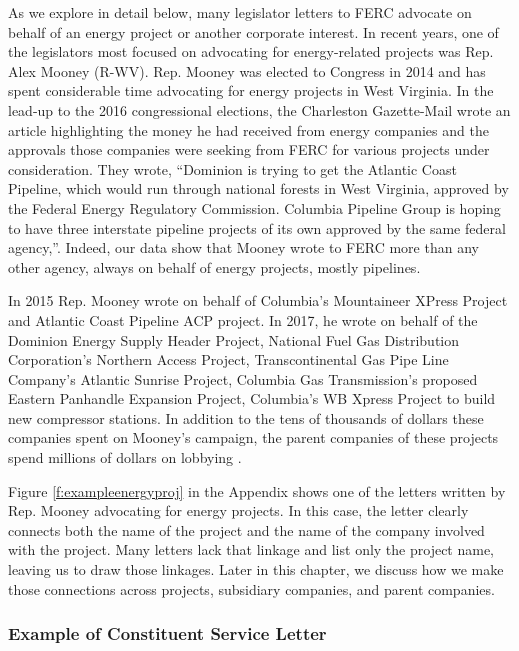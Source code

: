 As we explore in detail below, many legislator letters to FERC advocate on behalf of an energy project or another corporate interest. 
In recent years, one of the legislators most focused on advocating for energy-related projects was Rep. Alex Mooney (R-WV).  
Rep. Mooney was elected to Congress in 2014 and has spent considerable time advocating for energy projects in West Virginia. In the lead-up to the 2016 congressional elections, the Charleston Gazette-Mail wrote an article highlighting the money he had received from energy companies and the approvals those companies were seeking from FERC for various projects under consideration.  They wrote, ``Dominion is trying to get the Atlantic Coast Pipeline, which would run through national forests in West Virginia, approved by the Federal Energy Regulatory Commission. Columbia Pipeline Group is hoping to have three interstate pipeline projects of its own approved by the same federal agency,''\citep[pg. 4]{Brown2016cgm}.  Indeed, our data show that Mooney wrote to FERC more than any other agency, always on behalf of energy projects, mostly pipelines. 

In 2015 Rep. Mooney wrote on behalf of Columbia's Mountaineer XPress Project and Atlantic Coast Pipeline ACP project.  In 2017, he wrote on behalf of the Dominion Energy Supply Header Project, National Fuel Gas Distribution Corporation’s Northern Access Project, Transcontinental Gas Pipe Line Company's Atlantic Sunrise Project, Columbia Gas Transmission's proposed Eastern Panhandle Expansion Project, Columbia's WB Xpress Project to build new compressor stations. In addition to the tens of thousands of dollars these companies spent on Mooney's campaign, the parent companies of these projects spend millions of dollars on lobbying \citep{Lobbyview2019}.

Figure \ref{f:exampleenergyproj} in the Appendix shows one of the letters written by Rep. Mooney advocating for energy projects.  In this case, the letter clearly connects both the name of the project and the name of the company involved with the project.  Many letters lack that linkage and list only the project name, leaving us to draw those linkages.  Later in this chapter, we discuss how we make those connections across projects, subsidiary companies, and parent companies.  


\subsubsection{Example of Constituent Service Letter}

